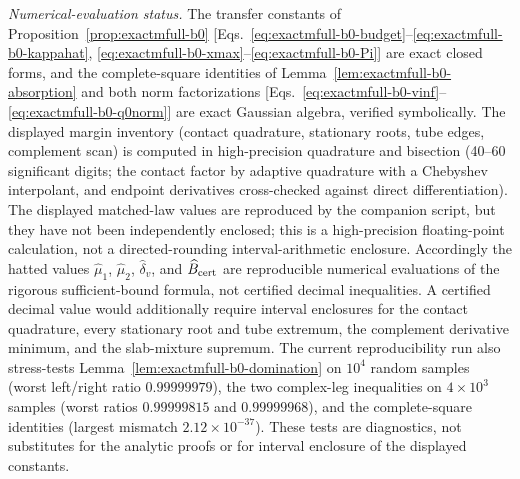 \begin{remark}
\emph{Numerical-evaluation status.}  The transfer constants of
Proposition~\ref{prop:exactmfull-b0}
[Eqs.~\eqref{eq:exactmfull-b0-budget}--\eqref{eq:exactmfull-b0-kappahat},
\eqref{eq:exactmfull-b0-xmax}--\eqref{eq:exactmfull-b0-Pi}] are exact
closed forms, and the complete-square identities of
Lemma~\ref{lem:exactmfull-b0-absorption} and both norm factorizations
[Eqs.~\eqref{eq:exactmfull-b0-vinf}--\eqref{eq:exactmfull-b0-q0norm}] are
exact Gaussian algebra, verified symbolically.  The displayed margin inventory
(contact quadrature, stationary roots, tube edges, complement scan) is
computed in high-precision quadrature and bisection (40--60 significant
digits; the contact factor by adaptive quadrature with a Chebyshev
interpolant, and endpoint derivatives cross-checked against direct
differentiation).  The displayed matched-law values are reproduced by the
companion script, but they have not been independently enclosed; this is a
high-precision floating-point calculation, not a directed-rounding
interval-arithmetic enclosure.  Accordingly the hatted values
\(\widehat\mu_1\), \(\widehat\mu_2\), \(\widehat\delta_v\), and
\(\widehat B_{\rm cert}\) are reproducible numerical evaluations of the
rigorous sufficient-bound formula, not certified decimal inequalities.  A
certified decimal value would additionally require interval enclosures for
the contact quadrature, every stationary root and tube extremum, the
complement derivative minimum, and the slab-mixture supremum.
The current reproducibility run also stress-tests
Lemma~\ref{lem:exactmfull-b0-domination} on \(10^4\) random samples
(worst left/right ratio \(0.99999979\)), the two complex-leg inequalities
on \(4\times10^3\) samples (worst ratios \(0.99999815\) and
\(0.99999968\)), and the complete-square identities (largest mismatch
\(2.12\times10^{-37}\)).  These tests are diagnostics, not substitutes for
the analytic proofs or for interval enclosure of the displayed constants.
\end{remark}
